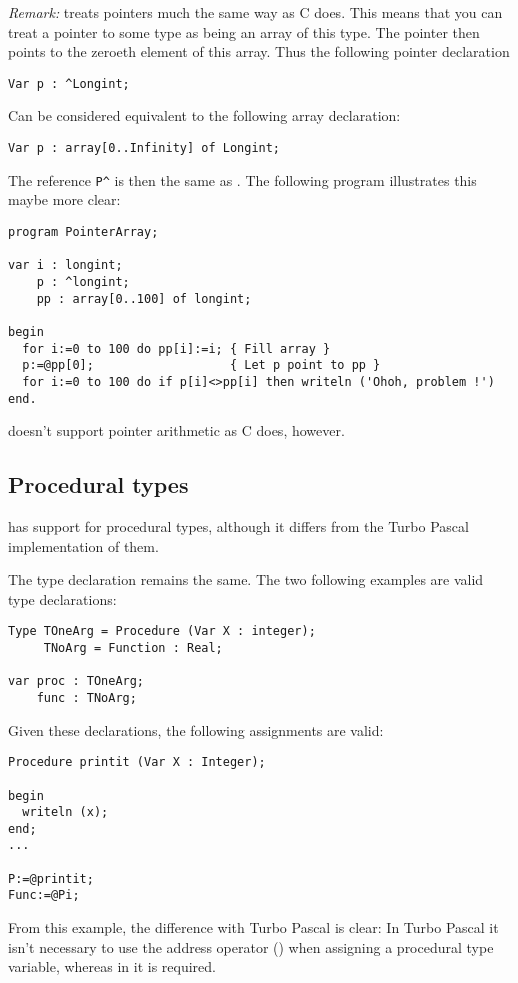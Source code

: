\documentclass{report}
\begin{document}
{\em Remark:} \fpc treats pointers much the same way as C does. This means
that you can treat a pointer to some type as being an array of this type.  
The pointer then points to the zeroeth element of this array. Thus the
following pointer declaration 
\begin{verbatim}
Var p : ^Longint;
\end{verbatim}
Can be considered equivalent to the following array declaration:
\begin{verbatim}
Var p : array[0..Infinity] of Longint;
\end{verbatim}
The reference \verb+P^+ is then the same as . The following program
illustrates this maybe more clear:
\begin{CodEx}
\begin{verbatim}
program PointerArray;

var i : longint;
    p : ^longint;
    pp : array[0..100] of longint;  

begin
  for i:=0 to 100 do pp[i]:=i; { Fill array }
  p:=@pp[0];                   { Let p point to pp }
  for i:=0 to 100 do if p[i]<>pp[i] then writeln ('Ohoh, problem !')
end.
\end{verbatim}
\end{CodEx}
\fpc doesn't support pointer arithmetic as C does, however.

\subsection{Procedural types}
\fpc has support for procedural types, although it differs from the Turbo
Pascal implementation of them.

The type declaration remains the same. The two following examples are valid
type declarations:
\begin{verbatim}
Type TOneArg = Procedure (Var X : integer);
     TNoArg = Function : Real;

var proc : TOneArg;
    func : TNoArg;
\end{verbatim}
Given these declarations, the following assignments are valid:
\begin{verbatim}
Procedure printit (Var X : Integer);

begin
  writeln (x);
end;
...

P:=@printit;
Func:=@Pi;
\end{verbatim}
From this example, the difference with Turbo Pascal is clear: In Turbo
Pascal it isn't necessary to use the address operator () 
when assigning a procedural type variable, whereas in \fpc it is required.
\end{document}
